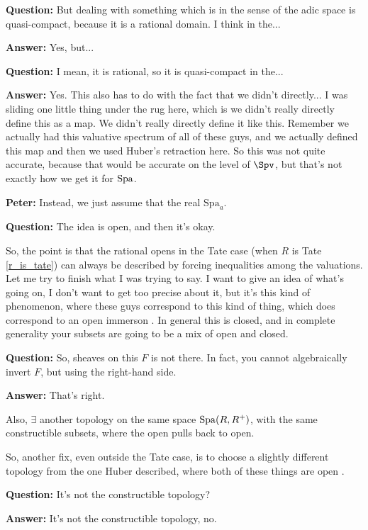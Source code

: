 \begin{example}
\textbf{Question:} But dealing with something which is in the sense of the adic space is quasi-compact, because it is a rational domain. I think in the... 

\textbf{Answer:} Yes, but...

\textbf{Question:} I mean, it is rational, so it is quasi-compact in the...

\textbf{Answer:} Yes. This also has to do with the fact that we didn't directly... I was sliding one little thing under the rug here, which is we didn't really directly define this  as a map. We didn't really directly define it like this. Remember we actually had this valuative spectrum of all of these guys, and we actually defined this map and then we used Huber's retraction here. So this was not quite accurate, because that would be accurate on the level of $\Spv$, but that's not exactly how we get it for $\operatorname{Spa}$. 

\textbf{Peter:} Instead, we just assume that the real $\mathrm{Spa}_a$. 

\textbf{Question:} The idea is open, and then it's okay.

So, the point is that the rational opens in the Tate case (when $R$ is Tate \ref{r_is_tate}) can always be described by forcing inequalities among the valuations. Let me try to finish what I was trying to say. I want to give an idea of what's going on, I don't want to get too precise about it, but it's this kind of phenomenon, where these guys correspond to this kind of thing, which does correspond to an open immerson . In general this is closed, and in complete generality your subsets are going to be a mix of open and closed.

\textbf{Question:} So, sheaves on this $F$ is not there. In fact, you cannot algebraically invert $F$, but using the right-hand side. 

\textbf{Answer:} That's right.

Also, $\exists$ another topology on the same space $\operatorname{Spa}(R, R^{+})$, with the same constructible subsets, where the open pulls back to open.

So, another fix, even outside the Tate case, is to choose a slightly different topology from the one Huber described, where both of these things are open . 

\textbf{Question:} It's not the constructible topology?

\textbf{Answer:} It's not the constructible topology, no. 


\end{example}
